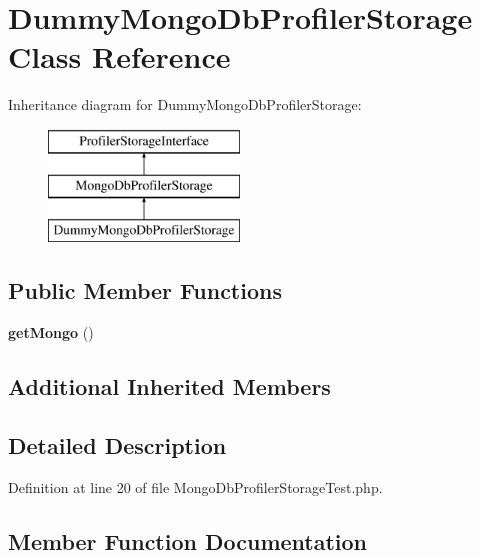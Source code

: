 \section{Dummy\+Mongo\+Db\+Profiler\+Storage Class Reference}
\label{class_symfony_1_1_component_1_1_http_kernel_1_1_tests_1_1_profiler_1_1_dummy_mongo_db_profiler_storage}
Inheritance diagram for Dummy\+Mongo\+Db\+Profiler\+Storage\+:\begin{figure}[H]
\begin{center}
\leavevmode
\includegraphics[height=3.000000cm]{class_symfony_1_1_component_1_1_http_kernel_1_1_tests_1_1_profiler_1_1_dummy_mongo_db_profiler_storage}
\end{center}
\end{figure}
\subsection*{Public Member Functions}
\begin{DoxyCompactItemize}
\item 
{\bf get\+Mongo} ()
\end{DoxyCompactItemize}
\subsection*{Additional Inherited Members}


\subsection{Detailed Description}


Definition at line 20 of file Mongo\+Db\+Profiler\+Storage\+Test.\+php.



\subsection{Member Function Documentation}

